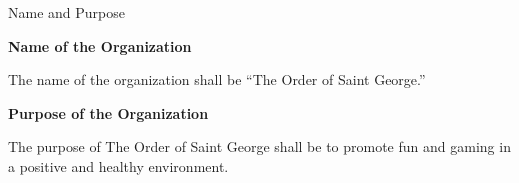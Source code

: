 {
	\begin{article}{Name and Purpose}
		\item \textbf{Name of the Organization}
		
		The name of the organization shall be \enquote{The Order of Saint George.}
		\item \textbf{Purpose of the Organization}
		
		The purpose of The Order of Saint George shall be to promote fun and gaming in a positive and healthy environment.
	\end{article}
}